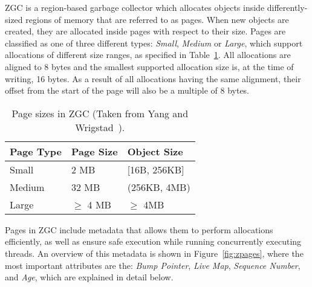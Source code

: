 
ZGC is a region-based garbage collector which allocates objects inside differently-sized regions of memory that are referred to as pages. When new objects are created, they are allocated inside pages with respect to their size. Pages are classified as one of three different types: \textit{Small}, \textit{Medium} or \textit{Large}, which support allocations of different size ranges, as specified in Table~\ref{table:zpage_sizes}. All allocations are aligned to 8 bytes and the smallest supported allocation size is, at the time of writing, 16 bytes. As a result of all allocations having the same alignment, their offset from the start of the page will also be a multiple of 8 bytes.

\begin{table}[H]
    \centering
    \begin{tabular}{lllll}
        Page Type & Page Size   & \multicolumn{3}{l}{Object Size}      \\ \hline
        Small     & 2 MB        & \multicolumn{3}{l}{{[}16B, 256KB{]}} \\
        Medium    & 32 MB       & \multicolumn{3}{l}{(256KB, 4MB)}     \\
        Large     & $\geq$ 4 MB & \multicolumn{3}{l}{$\geq$ 4MB}       \\
    \end{tabular}
    \caption{Page sizes in ZGC (Taken from Yang and Wrigstad~\cite{zgc:zpage_size_table}).}
    \label{table:zpage_sizes}
\end{table}

Pages in ZGC include metadata that allows them to perform allocations efficiently, as well as ensure safe execution while running concurrently executing threads. An overview of this metadata is shown in Figure~\ref{fig:zpages}, where the most important attributes are the: \textit{Bump Pointer}, \textit{Live Map}, \textit{Sequence Number}, and \textit{Age}, which are explained in detail below.


